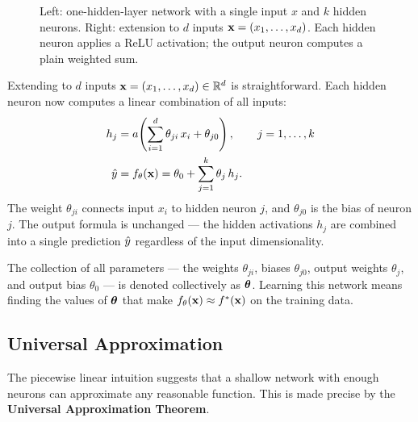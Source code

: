 \begin{figure}[h]
 \centering
 \begin{minipage}{0.45\textwidth}
 \centering
 \resizebox{\textwidth}{!}{}
 \end{minipage}
 \hfill
 \begin{minipage}{0.52\textwidth}
 \centering
 \resizebox{\textwidth}{!}{}
 \end{minipage}
 \caption{Left: one-hidden-layer network with a single input $x$ and $k$ hidden neurons. Right: extension to $d$ inputs $\mathbf{x} = (x_1, \ldots, x_d)$. Each hidden neuron applies a ReLU activation; the output neuron computes a plain weighted sum.}
 \label{fig:mlp}
\end{figure}

Extending to $d$ inputs $\mathbf{x} = (x_1, \ldots, x_d) \in \mathbb{R}^d$ is straightforward. Each hidden neuron now computes a linear combination of all inputs:
\begin{align}
 h_j &= a\!\left(\sum_{i=1}^{d} \theta_{ji} \, x_i + \theta_{j0}\right), \qquad j = 1, \ldots, k \\
 \hat{y} &= f_\theta(\mathbf{x}) = \theta_0 + \sum_{j=1}^{k} \theta_j \, h_j.
\end{align}
The weight $\theta_{ji}$ connects input $x_i$ to hidden neuron $j$, and $\theta_{j0}$ is the bias of neuron $j$. The output formula is unchanged --- the hidden activations $h_j$ are combined into a single prediction $\hat{y}$ regardless of the input dimensionality.

The collection of all parameters --- the weights $\theta_{ji}$, biases $\theta_{j0}$, output weights $\theta_j$, and output bias $\theta_0$ --- is denoted collectively as $\boldsymbol{\theta}$. Learning this network means finding the values of $\boldsymbol{\theta}$ that make $f_\theta(\mathbf{x}) \approx f^*(\mathbf{x})$ on the training data. 

\subsection{Universal Approximation}

The piecewise linear intuition suggests that a shallow network with enough neurons can approximate any reasonable function. This is made precise by the \textbf{Universal Approximation Theorem}.


